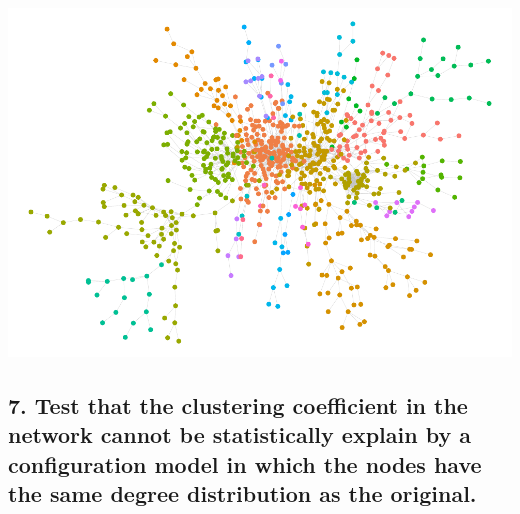 \documentclass[
]{article}
\newenvironment{Shaded}{\begin{snugshade}}{\end{snugshade}}
\newcommand{\AttributeTok}[1]{\textcolor[rgb]{0.13,0.29,0.53}{#1}}
\newcommand{\CommentTok}[1]{\textcolor[rgb]{0.56,0.35,0.01}{\textit{#1}}}
\newcommand{\FloatTok}[1]{\textcolor[rgb]{0.00,0.00,0.81}{#1}}
\newcommand{\FunctionTok}[1]{\textcolor[rgb]{0.13,0.29,0.53}{\textbf{#1}}}
\newcommand{\NormalTok}[1]{#1}
\newcommand{\OtherTok}[1]{\textcolor[rgb]{0.56,0.35,0.01}{#1}}
\newcommand{\SpecialCharTok}[1]{\textcolor[rgb]{0.81,0.36,0.00}{\textbf{#1}}}
\newcommand{\StringTok}[1]{\textcolor[rgb]{0.31,0.60,0.02}{#1}}
\begin{document}
\begin{Shaded}
\end{Shaded}

\includegraphics{export-network_files/figure-latex/unnamed-chunk-15-2.pdf}

\subsection{7. Test that the clustering coefficient in the network
cannot be statistically explain by a configuration model in which the
nodes have the same degree distribution as the
original.}\label{test-that-the-clustering-coefficient-in-the-network-cannot-be-statistically-explain-by-a-configuration-model-in-which-the-nodes-have-the-same-degree-distribution-as-the-original.}
\end{document}
